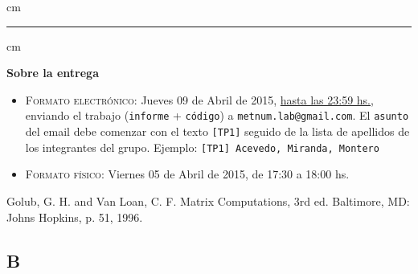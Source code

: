  cm
\hrule
{} cm

{\bf Sobre la entrega}
\begin{itemize}
\item \textsc{Formato electr\'onico:} Jueves 09 de Abril de 2015, \underline{hasta las 23:59 hs.}, enviando el trabajo
(\texttt{informe} + \texttt{c\'odigo}) a \texttt{metnum.lab@gmail.com}. El \texttt{asunto} del email debe comenzar con el texto \verb|[TP1]| seguido
de la lista de apellidos de los integrantes del grupo. Ejemplo: \texttt{[TP1] Acevedo, Miranda, Montero}
\item \textsc{Formato f\'isico:} Viernes 05 de Abril de 2015, de 17:30 a 18:00 hs.
\end{itemize}

\begin{thebibliography}{1}
	 Golub, G. H. and Van Loan, C. F. Matrix Computations, 3rd ed. Baltimore, MD: Johns Hopkins, p. 51, 1996.
\end{thebibliography}


\subsection{B}

